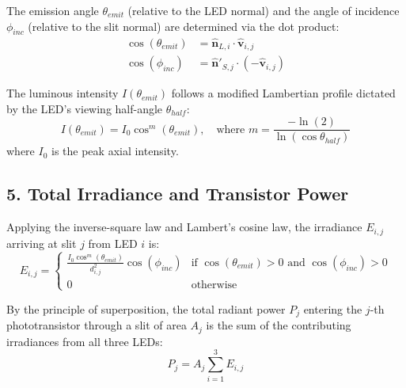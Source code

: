 \documentclass{article}
\begin{document}
The emission angle $\theta_{emit}$ (relative to the LED normal) and the angle of incidence $\phi_{inc}$ (relative to the slit normal) are determined via the dot product:
\begin{align}
    \cos(\theta_{emit}) &= \mathbf{\hat{n}}_{L,i} \cdot \mathbf{\hat{v}}_{i,j} \\
    \cos(\phi_{inc}) &= \mathbf{\hat{n}}'_{S,j} \cdot (-\mathbf{\hat{v}}_{i,j})
\end{align}

The luminous intensity $I(\theta_{emit})$ follows a modified Lambertian profile dictated by the LED's viewing half-angle $\theta_{half}$:
\begin{equation}
    I(\theta_{emit}) = I_0 \cos^m(\theta_{emit}), \quad \text{where } m = \frac{-\ln(2)}{\ln(\cos\theta_{half})}
\end{equation}
where $I_0$ is the peak axial intensity.

\subsection*{5. Total Irradiance and Transistor Power}
Applying the inverse-square law and Lambert's cosine law, the irradiance $E_{i,j}$ arriving at slit $j$ from LED $i$ is:
\begin{equation}
    E_{i,j} = 
    \begin{cases} 
      \frac{I_0 \cos^m(\theta_{emit})}{d_{i,j}^2} \cos(\phi_{inc}) & \text{if } \cos(\theta_{emit}) > 0 \text{ and } \cos(\phi_{inc}) > 0 \\
      0 & \text{otherwise}
    \end{cases}
\end{equation}

By the principle of superposition, the total radiant power $P_j$ entering the $j$-th phototransistor through a slit of area $A_j$ is the sum of the contributing irradiances from all three LEDs:
\begin{equation}
    P_j = A_j \sum_{i=1}^{3} E_{i,j}
\end{equation}
\end{document}
